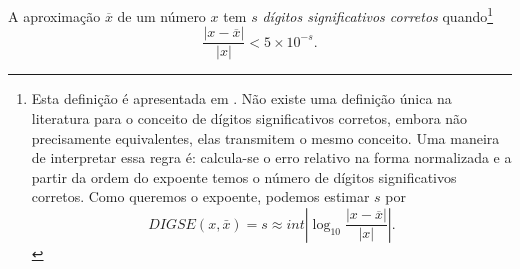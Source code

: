\begin{defn}\label{def:num_dig_sig_corretos}
A aproximação $\overline{x}$ de um número $x$ tem $s$ \emph{dígitos significativos corretos} quando\footnote{Esta definição é apresentada em \cite{Burden2013}. Não existe uma definição única na literatura para o conceito de dígitos significativos corretos, embora não precisamente equivalentes, elas transmitem o mesmo conceito.
Uma maneira de interpretar essa regra é: calcula-se o erro relativo na forma normalizada e a partir da ordem do expoente temos o número de dígitos significativos corretos. Como queremos o expoente, podemos estimar $s$ por
\begin{equation}  DIGSE(x,\bar{x})=s \approx int \left|\log_{10} \frac{|x-\overline{x}|}{|x|}\right|.  \end{equation}
}
\begin{equation}
\frac{|x-\overline{x}|}{|x|} < 5\times 10^{-s}.
\end{equation}
\end{defn}


